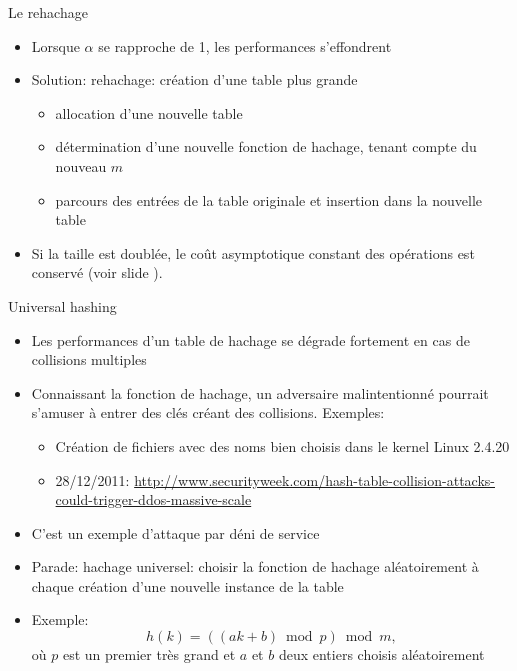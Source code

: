 \begin{frame}{Le rehachage}
\begin{itemize}
\item Lorsque $\alpha$ se rapproche de 1, les performances s'effondrent
\item Solution: \alert{rehachage}: création d'une table plus grande
\begin{itemize}
\item allocation d'une nouvelle table
\item détermination d'une nouvelle fonction de hachage, tenant compte du nouveau $m$
\item parcours des entrées de la table originale et insertion dans la nouvelle table
\end{itemize}
\item Si la taille est doublée, le coût asymptotique constant des opérations est conservé (voir slide \pageref{sec04:amortie}).
\end{itemize}


\end{frame}

\begin{frame}{Universal hashing}
\begin{itemize}
\item Les performances d'un table de hachage se dégrade fortement en
  cas de collisions multiples
\item Connaissant la fonction de hachage, un adversaire malintentionné pourrait s'amuser à entrer des clés créant des collisions. Exemples:
\begin{itemize}
\item Création de fichiers avec des noms bien choisis dans le kernel Linux 2.4.20
\item 28/12/2011: {\scriptsize \url{http://www.securityweek.com/hash-table-collision-attacks-could-trigger-ddos-massive-scale}}
\end{itemize}
\item C'est un exemple d'\alert{attaque par déni de service}

\bigskip

\item Parade: \alert{hachage universel}: choisir la fonction de hachage aléatoirement à chaque création d'une nouvelle instance de la table 
\item Exemple:
$$h(k)=((ak+b) \bmod p)\bmod m,$$
où $p$ est un premier très grand et $a$ et $b$ deux entiers choisis aléatoirement
\end{itemize}


\end{frame}

